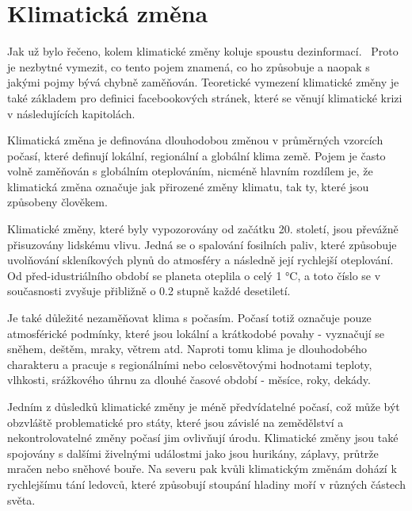 \chapter{Klimatická změna}
\label{chapter:klimaticka-zmena}

    Jak už bylo řečeno, kolem klimatické změny koluje spoustu dezinformací.~\citep{kolmes2011climate} Proto je nezbytné vymezit, co tento pojem znamená, co ho způsobuje a naopak s jakými pojmy bývá chybně zaměňován. Teoretické vymezení klimatické změny je také základem pro definici facebookových stránek, které se věnují klimatické krizi v následujících kapitolách. 
    
    Klimatická změna je definována dlouhodobou změnou v průměrných vzorcích počasí, které definují lokální, regionální a globální klima země. Pojem je často volně zaměňován s globálním oteplováním, nicméně hlavním rozdílem je, že klimatická změna označuje jak přirozené změny klimatu, tak ty, které jsou způsobeny člověkem.
    
    Klimatické změny, které byly vypozorovány od začátku 20. století, jsou převáž\-ně přisuzovány lidskému vlivu. Jedná se o spalování fosilních paliv, které způsobuje uvolňování skleníkových plynů do atmosféry a následně její rychlejší oteplování. Od před-idustriálního období se planeta oteplila o celý 1 °C, a toto číslo se v současnosti zvyšuje přibližně o 0.2 stupně každé desetiletí. 
    
    Je také důležité nezaměňovat klima s počasím. Počasí totiž označuje pouze atmosférické podmínky, které jsou lokální a krátkodobé povahy - vyznačují se sněhem, deštěm, mraky, větrem atd. Naproti tomu klima je dlouhodobého charakteru a pracuje s regionálními nebo celosvětovými hodnotami teploty, vlhkosti, srážkového úhrnu za dlouhé časové období - měsíce, roky, dekády.~\citep{nasa_2021}
    
    Jedním z důsledků klimatické změny je méně předvídatelné počasí, což může být obzvláště problematické pro státy, které jsou závislé na zemědělství a nekontrolovatelné změny počasí jim ovlivňují úrodu. Klimatické změny jsou také spojovány s dalšími živelnými událostmi jako jsou hurikány, záplavy, průtrže mračen nebo sněhové bouře. Na severu pak kvůli klimatickým změnám dohází k rychlejšímu tání ledovců, které způsobují stoupání hladiny moří v různých částech světa. 
    
